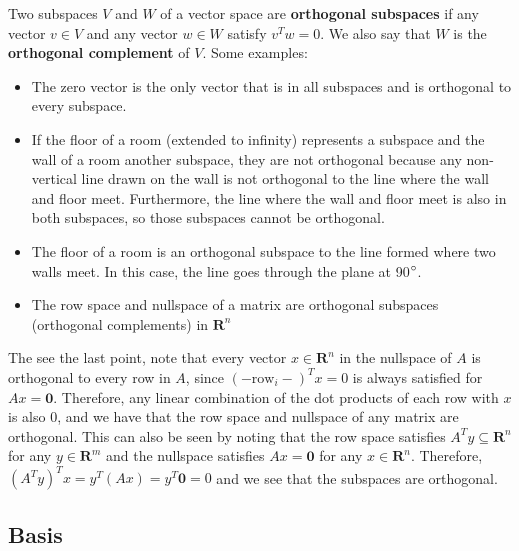 \documentclass[11pt]{article}
\theoremstyle{plain}
\theoremstyle{definition}
\theoremstyle{remark}
\numberwithin{equation}{section}
\begin{document}
Two subspaces $V$ and $W$ of a vector space are {\bf orthogonal subspaces} if any vector $v \in V$ and any vector $w \in W$ satisfy $v^T w = 0$. We also say that $W$ is the {\bf orthogonal complement} of $V$. Some examples:
\begin{itemize}[noitemsep] %
\item The zero vector is the only vector that is in all subspaces and is orthogonal to every subspace.
\item If the floor of a room (extended to infinity) represents a subspace and the wall of a room another subspace, they are not orthogonal because any non-vertical line drawn on the wall is not orthogonal to the line where the wall and floor meet. Furthermore, the line where the wall and floor meet is also in both subspaces, so those subspaces cannot be orthogonal.
\item The floor of a room is an orthogonal subspace to the line formed where two walls meet. In this case, the line goes through the plane at 90$\degree$.
\item The row space and nullspace of a matrix are orthogonal subspaces (orthogonal complements) in $\mathbf{R}^n$
\end{itemize}

The see the last point, note that every vector $x \in \mathbf{R}^n$ in the nullspace of $A$ is orthogonal to every row in $A$, since $( - \text{row}_i - )^T x = 0$ is always satisfied for $A x = \mathbf{0}$. Therefore, any linear combination of the dot products of each row with $x$ is also $0$, and we have that the row space and nullspace of any matrix are orthogonal. This can also be seen by noting that the row space satisfies $A^T y \subseteq \mathbf{R}^n$ for any $y \in \mathbf{R}^m$ and the nullspace satisfies $A x = \mathbf{0}$ for any $x \in \mathbf{R}^n$. Therefore, $(A^T y)^T x = y^T (A x) = y^T \mathbf{0} = 0$ and we see that the subspaces are orthogonal.




\subsection{Basis}
\end{document}
